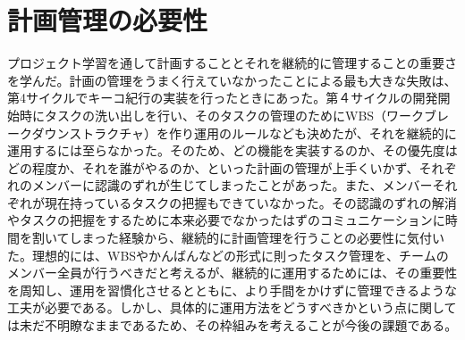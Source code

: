 \section{計画管理の必要性}
プロジェクト学習を通して計画することとそれを継続的に管理することの重要さを学んだ。計画の管理をうまく行えていなかったことによる最も大きな失敗は、第4サイクルでキーコ紀行の実装を行ったときにあった。第４サイクルの開発開始時にタスクの洗い出しを行い、そのタスクの管理のためにWBS（ワークブレークダウンストラクチャ）を作り運用のルールなども決めたが、それを継続的に運用するには至らなかった。そのため、どの機能を実装するのか、その優先度はどの程度か、それを誰がやるのか、といった計画の管理が上手くいかず、それぞれのメンバーに認識のずれが生じてしまったことがあった。また、メンバーそれぞれが現在持っているタスクの把握もできていなかった。その認識のずれの解消やタスクの把握をするために本来必要でなかったはずのコミュニケーションに時間を割いてしまった経験から、継続的に計画管理を行うことの必要性に気付いた。理想的には、WBSやかんばんなどの形式に則ったタスク管理を、チームのメンバー全員が行うべきだと考えるが、継続的に運用するためには、その重要性を周知し、運用を習慣化させるとともに、より手間をかけずに管理できるような工夫が必要である。しかし、具体的に運用方法をどうすべきかという点に関しては未だ不明瞭なままであるため、その枠組みを考えることが今後の課題である。
